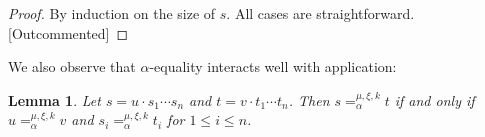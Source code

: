 \documentclass{lmcs}
\theoremstyle{theorem}\newtheorem{theorem}{Theorem}
\theoremstyle{theorem}\newtheorem{lemma}[theorem]{Lemma}
\theoremstyle{theorem}\newtheorem{corollary}[theorem]{Corollary}
\theoremstyle{definition}\newtheorem{definition}[theorem]{Definition}
\theoremstyle{definition}\newtheorem{example}[theorem]{Example}
\newcommand{\Vfree}{\mathcal{V}_{\mathit{nonb}}}
\newcommand{\Vbound}{\mathcal{V}_{\mathit{binder}}}
\newcommand{\FV}{\mathit{FV}}
\newcommand{\identifier}[1]{\mathtt{#1}}
\newcommand{\afun}{\identifier{f}}
\newcommand{\avar}{x}
\newcommand{\bvar}{y}
\newcommand{\ameta}{F}
\newcommand{\abs}[2]{\lambda #1.#2}
\newcommand{\meta}[2]{#1\langle#2\rangle}
\newcommand{\tuple}[2]{\llparenthesis #1,\dots,#2 \rrparenthesis}
\begin{document}
\begin{proof}
By induction on the size of $s$.
All cases are straightforward. [Outcommented]
\end{proof}

We also observe that $\alpha$-equality interacts well with application:

\begin{lemma}\label{lem:alphaappl}
Let $s = u \cdot s_1 \cdots s_n$ and $t = v \cdot t_1 \cdots t_n$.
Then $s =_\alpha^{\mu,\xi,k} t$ if and only if $u =_\alpha^{\mu,\xi,k} v$ and
$s_i =_\alpha^{\mu,\xi,k} t_i$ for $1 \leq i \leq n$.
\end{lemma}
\end{document}
